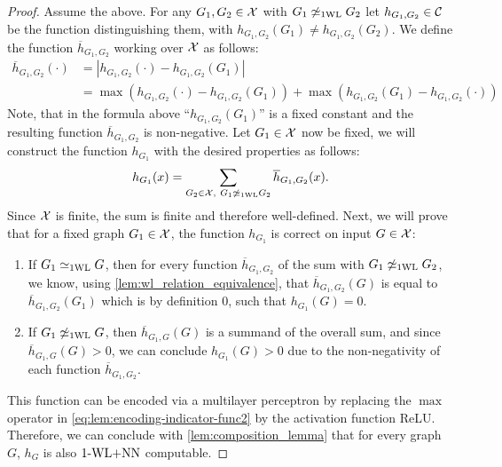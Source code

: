 \begin{proof}
    Assume the above. For any $G_1, G_2 \in \mathcal{X}$ with $G_1 \not\simeq_{\text{1WL}} G_2$ let $h_{G_1, G_2} \in \mathcal{C}$ be the function distinguishing them, with $h_{G_1, G_2}(G_1) \neq h_{G_1, G_2}(G_2)$. We define the function $\overline{h}_{G_1,G_2}$ working over $\mathcal{X}$ as follows:
    \begin{align}\label{eq:lem:encoding-indicator-func2}
        \overline{h}_{G_1, G_2}(\cdot) &= |h_{G_1, G_2}(\cdot) - h_{G_1, G_2}(G_1)| \nonumber \nonumber\\
        &= \max(h_{G_1, G_2}(\cdot) - h_{G_1, G_2}(G_1)) + \max(h_{G_1, G_2}(G_1) - h_{G_1, G_2}(\cdot))
    \end{align}
    Note, that in the formula above ``$h_{G_1, G_2}(G_1)$'' is a fixed constant and the resulting function $\overline{h}_{G_1, G_2}$ is non-negative.
    Let $G_1 \in \mathcal{X}$ now be fixed, we will construct the function $h_{G_1}$ with the desired properties as follows:
    \begin{align*}
        h_{G_1}(x) = \sum_{G_2 \in \mathcal{X}, \ G_1 \not\simeq_{\text{1WL}} G_2} \overline{h}_{G_1, G_2}(x).
    \end{align*}
    Since $\mathcal{X}$ is finite, the sum is finite and therefore well-defined. Next, we will prove that for a fixed graph $G_1 \in \mathcal{X}$, the function $h_{G_1}$ is correct on input $G \in \mathcal{X}$:
    \begin{enumerate}
        \item If $G_1 \simeq_{\text{1WL}} G$, then for every function $\overline{h}_{G_1, G_2}$ of the sum with $G_1 \not\simeq_{\text{1WL}} G_2$, we know, using \autoref{lem:wl_relation_equivalence}, that $\overline{h}_{G_1, G_2}(G)$ is equal to $\overline{h}_{G_1, G_2}(G_1)$ which is by definition $0$, such that $h_{G_1}(G) = 0$.
        \item If $G_1 \not\simeq_{\text{1WL}} G$, then $\overline{h}_{G_1, G}(G)$ is a summand of the overall sum, and since $\overline{h}_{G_1, G}(G) > 0$, 
        we can conclude $h_{G_1}(G) > 0$ due to the non-negativity of each function $\overline{h}_{G_1, G_2}$.
    \end{enumerate}

    This function can be encoded via a multilayer perceptron by replacing the $\max$ operator in \autoref{eq:lem:encoding-indicator-func2} by the activation function ReLU. Therefore, we can conclude with \autoref{lem:composition_lemma} that for every graph $G$, $h_G$ is also $\text{1-WL+NN}$ computable.
\end{proof}

